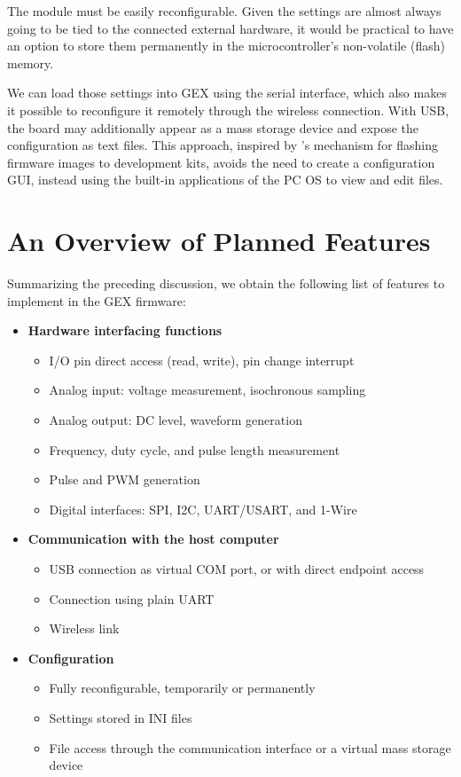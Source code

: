 The module must be easily reconfigurable. Given the settings are almost always going to be tied to the connected external hardware, it would be practical to have an option to store them permanently in the microcontroller's non-volatile (flash) memory.

We can load those settings into GEX using the serial interface, which also makes it possible to reconfigure it remotely through the wireless connection. With USB, the board may additionally appear as a mass storage device and expose the configuration as text files. This approach, inspired by \mbed's mechanism for flashing firmware images to development kits, avoids the need to create a configuration \gls{GUI}, instead using the built-in applications of the \gls{PC} \gls{OS} to view and edit files.

\section{An Overview of Planned Features}

Summarizing the preceding discussion, we obtain the following list of features to implement in the GEX firmware:

\begin{itemize}
	\item \textbf{Hardware interfacing functions}
		\begin{itemize}
			\item I/O pin direct access (read, write), pin change interrupt
			\item Analog input: voltage measurement, isochronous sampling
			\item Analog output: DC level, waveform generation
			\item Frequency, duty cycle, and pulse length measurement
			\item Pulse and \gls{PWM} generation
			\item Digital interfaces: \gls{SPI}, \gls{I2C}, \gls{UART}/\gls{USART}, and 1-Wire
		\end{itemize}
	\pagebreak[0]
	\item \textbf{Communication with the host computer}
		\begin{itemize}
			\item \gls{USB} connection as virtual COM port, or with direct endpoint access
			\item Connection using plain \gls{UART}
			\item Wireless link
		\end{itemize}
	\item \textbf{Configuration}
		\begin{itemize}
			\item Fully reconfigurable, temporarily or permanently
			\item Settings stored in INI files
			\item File access through the communication interface or a virtual mass storage device
		\end{itemize}
\end{itemize}

